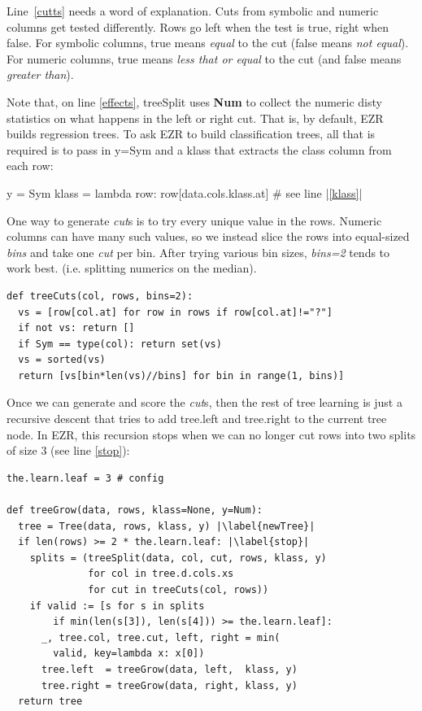 \documentclass[AMA,STIX2COL]{WileyNJDv5}
\newcommand{\cls}[1]{%
  \setlength{\fboxsep}{1.5pt}%
  \colorbox{clsbg}{\sffamily\bfseries{#1}}%
}
\begin{document}
Line~\ref{cutts} needs a word of explanation.
Cuts from symbolic and numeric columns get tested differently. Rows go left when the test is true, right when false. For symbolic columns, true means {\em equal} to the cut (false means 
{\em not equal}). For numeric columns, true means {\em less that or equal} to  the cut (and false means {\em greater than}).

Note that, on  line \ref{effects}, \textsf{treeSplit}   uses \cls{Num} to  
collect the numeric  \textsf{disty} statistics on what happens in the left or right cut. That is, by default, EZR builds regression trees.
To ask EZR to build classification
trees, all that is required is to pass in \textsf{y=Sym} and
a \textsf{klass} that extracts the class column from each row:
\begin{repl}
y = Sym
klass = lambda row: row[data.cols.klass.at] # see line |\ref{klass}|
\end{repl}
One way to generate {\em cut}s is to try every unique value in the rows. Numeric columns can have many such values, so we instead slice the rows into equal-sized 
{\em bins} and take one 
{\em cut} per bin. After trying  various bin sizes,
 {\em bins=2} tends to work best.
(i.e. splitting numerics on the median).
\begin{verbatim}
def treeCuts(col, rows, bins=2):
  vs = [row[col.at] for row in rows if row[col.at]!="?"]
  if not vs: return []
  if Sym == type(col): return set(vs)
  vs = sorted(vs)
  return [vs[bin*len(vs)//bins] for bin in range(1, bins)]
\end{verbatim}
Once we can generate and score the {\em cut}s, then the rest of tree learning is just
a recursive descent that tries to add \textsf{tree.left} and \textsf{tree.right} to the
current \textsf{tree} node.  In EZR, this recursion stops when
we can no longer cut rows into two splits of size 3 (see line \ref{stop}):
\begin{verbatim}
the.learn.leaf = 3 # config

def treeGrow(data, rows, klass=None, y=Num):
  tree = Tree(data, rows, klass, y) |\label{newTree}|
  if len(rows) >= 2 * the.learn.leaf: |\label{stop}|
    splits = (treeSplit(data, col, cut, rows, klass, y)
              for col in tree.d.cols.xs
              for cut in treeCuts(col, rows))
    if valid := [s for s in splits
        if min(len(s[3]), len(s[4])) >= the.learn.leaf]:
      _, tree.col, tree.cut, left, right = min(
        valid, key=lambda x: x[0])
      tree.left  = treeGrow(data, left,  klass, y)
      tree.right = treeGrow(data, right, klass, y)
  return tree
\end{verbatim}
\end{document}
